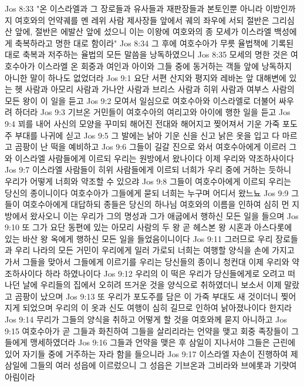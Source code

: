 Jos 8:33  "온 이스라엘과 그 장로들과 유사들과 재판장들과 본토인뿐 아니라 이방인까지 여호와의 언약궤를 멘 레위 사람 제사장들 앞에서 궤의 좌우에 서되 절반은 그리심산 앞에, 절반은 에발산 앞에 섰으니 이는 이왕에 여호와의 종 모세가 이스라엘 백성에게 축복하라고 명한 대로 함이라"
Jos 8:34  그 후에 여호수아가 무릇 율법책에 기록된 대로 축복과 저주하는 율법의 모든 말씀을 낭독하였으니
Jos 8:35  모세의 명한 것은 여호수아가 이스라엘 온 회중과 여인과 아이와 그들 중에 동거하는 객들 앞에 낭독하지 아니한 말이 하나도 없었더라
Jos 9:1  요단 서편 산지와 평지와 레바논 앞 대해변에 있는 헷 사람과 아모리 사람과 가나안 사람과 브리스 사람과 히위 사람과 여부스 사람의 모든 왕이 이 일을 듣고
Jos 9:2  모여서 일심으로 여호수아와 이스라엘로 더불어 싸우려 하더라
Jos 9:3  기브온 거민들이 여호수아의 여리고와 아이에 행한 일을 듣고
Jos 9:4  꾀를 내어 사신의 모양을 꾸미되 해어진 전대와 해어지고 찢어져서 기운 가죽 포도주 부대를 나귀에 싣고
Jos 9:5  그 발에는 낡아 기운 신을 신고 낡은 옷을 입고 다 마르고 곰팡이 난 떡을 예비하고
Jos 9:6  그들이 길갈 진으로 와서 여호수아에게 이르러 그와 이스라엘 사람들에게 이르되 우리는 원방에서 왔나이다 이제 우리와 약조하사이다
Jos 9:7  이스라엘 사람들이 히위 사람들에게 이르되 너희가 우리 중에 거하는 듯하니 우리가 어떻게 너희와 약조할 수 있으랴
Jos 9:8  그들이 여호수아에게 이르되 우리는 당신의 종이니이다 여호수아가 그들에게 묻되 너희는 누구며 어디서 왔느뇨
Jos 9:9  그들이 여호수아에게 대답하되 종들은 당신의 하나님 여호와의 이름을 인하여 심히 먼 지방에서 왔사오니 이는 우리가 그의 명성과 그가 애굽에서 행하신 모든 일을 들으며
Jos 9:10  또 그가 요단 동편에 있는 아모리 사람의 두 왕 곧 헤스본 왕 시혼과 아스다롯에 있는 바산 왕 옥에게 행하신 모든 일을 들었음이니이다
Jos 9:11  그러므로 우리 장로들과 우리 나라의 모든 거민이 우리에게 일러 가로되 너희는 여행할 양식을 손에 가지고 가서 그들을 맞아서 그들에게 이르기를 우리는 당신들의 종이니 청컨대 이제 우리와 약조하사이다 하라 하였나이다
Jos 9:12  우리의 이 떡은 우리가 당신들에게로 오려고 떠나던 날에 우리들의 집에서 오히려 뜨거운 것을 양식으로 취하였더니 보소서 이제 말랐고 곰팡이 났으며
Jos 9:13  또 우리가 포도주를 담은 이 가죽 부대도 새 것이더니 찢어지게 되었으며 우리의 이 옷과 신도 여행이 심히 길므로 인하여 낡아졌나이다 한지라
Jos 9:14  무리가 그들의 양식을 취하고 어떻게 할 것을 여호와께 묻지 아니하고
Jos 9:15  여호수아가 곧 그들과 화친하여 그들을 살리리라는 언약을 맺고 회중 족장들이 그들에게 맹세하였더라
Jos 9:16  그들과 언약을 맺은 후 삼일이 지나서야 그들은 근린에 있어 자기들 중에 거주하는 자라 함을 들으니라
Jos 9:17  이스라엘 자손이 진행하여 제 삼일에 그들의 여러 성읍에 이르렀으니 그 성읍은 기브온과 그비라와 브에롯과 기럇여아림이라
